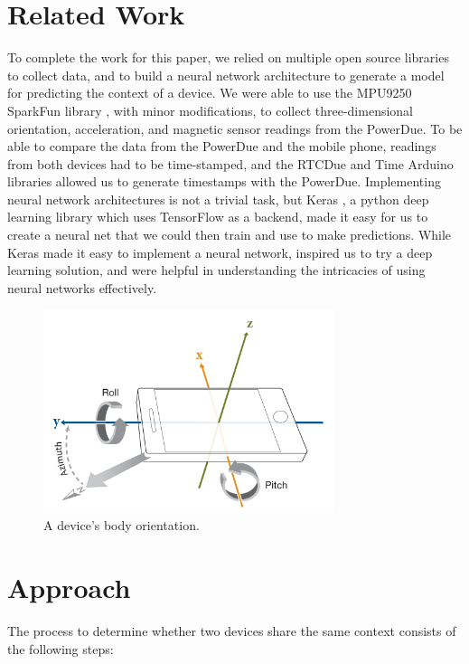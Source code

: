 \documentclass[journal]{IEEEtranTIE}
\begin{document}
\section{Related Work}

To complete the work for this paper, we relied on multiple open source libraries
to collect data, and to build a neural network architecture to generate a model
for predicting the context of a device. We were able to use the MPU9250 SparkFun
library \cite{MPU9250}, with minor modifications, to collect three-dimensional
orientation, acceleration, and magnetic sensor readings from the PowerDue. To be
able to compare the data from the PowerDue and the mobile phone, readings from
both devices had to be time-stamped, and the RTCDue \cite{RTCDue} and Time
\cite{TimeLib} Arduino libraries allowed us to generate timestamps with the
PowerDue. Implementing neural network architectures is not a trivial task, but
Keras \cite{Keras}, a python deep learning library which uses TensorFlow as a
backend, made it easy for us to create a neural net that we could then train and
use to make predictions. While Keras made it easy to implement a neural network,
\cite{LeCunn,DeepLearning} inspired us to try a deep learning solution, and
\cite{DeepLearning,Dropout} were helpful in understanding the intricacies of
using neural networks effectively.


\begin{figure}[!t]\centering
	\includegraphics[width=8.5cm]{phoneOrientation}
	\caption{A device's body orientation.}\label{fig:fig1}
\end{figure}


\section{Approach}

The process to determine whether two devices share the same context consists of
the following steps:
\end{document}
